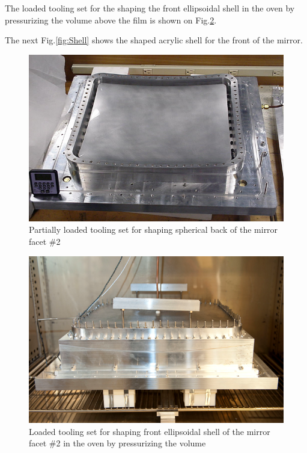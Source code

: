 The loaded tooling set for the shaping the front ellipsoidal shell in the oven by pressurizing the volume above the film is shown on  Fig.\ref{fig:Pres_Shaping_Front}.

The next Fig.\ref{fig:Shell} shows the shaped acrylic shell for the front of the mirror.

\begin{figure}[ht]
    \centering
    \includegraphics[width=0.95\linewidth]{images/Vac_Mol_Back.png}
    \caption{Partially loaded tooling set for shaping spherical back of the mirror facet \#2}
    \label{fig:Vac_Mol_Back}
\end{figure}

\begin{figure}[ht]
    \centering
    \includegraphics[width=0.95\linewidth]{images/Pres_Shaping_Front.png}
    \caption{Loaded tooling set for shaping front ellipsoidal shell of the mirror facet \#2 in the oven by pressurizing the volume}
    \label{fig:Pres_Shaping_Front}
\end{figure}

